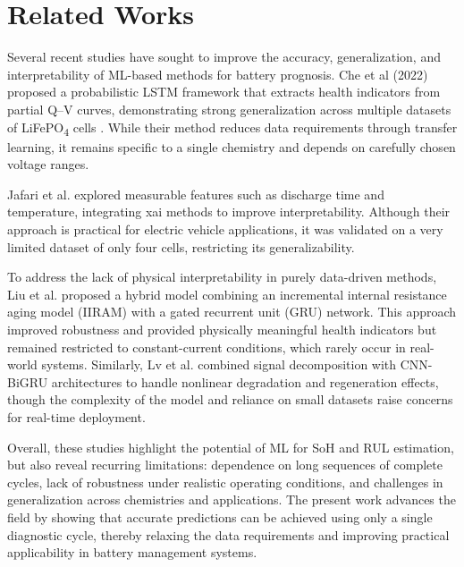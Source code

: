 \section{Related Works} \label{sec:related_works}

Several recent studies have sought to improve the accuracy, generalization, and interpretability of ML-based methods for battery prognosis. Che et al (2022) proposed a probabilistic LSTM framework that extracts health indicators from partial Q--V curves, demonstrating strong generalization across multiple datasets of LiFePO\textsubscript{4} cells \cite{Che2022}. While their method reduces data requirements through transfer learning, it remains specific to a single chemistry and depends on carefully chosen voltage ranges.  

Jafari et al. \cite{Jafari2024} explored measurable features such as discharge time and temperature, integrating \acf{xai} methods to improve interpretability. Although their approach is practical for electric vehicle applications, it was validated on a very limited dataset of only four cells, restricting its generalizability.

To address the lack of physical interpretability in purely data-driven methods, Liu et al. \cite{Liu2025} proposed a hybrid model combining an incremental internal resistance aging model (IIRAM) with a gated recurrent unit (GRU) network. This approach improved robustness and provided physically meaningful health indicators but remained restricted to constant-current conditions, which rarely occur in real-world systems. Similarly, Lv et al. \cite{Lv2024} combined signal decomposition with CNN-BiGRU architectures to handle nonlinear degradation and regeneration effects, though the complexity of the model and reliance on small datasets raise concerns for real-time deployment.  

Overall, these studies highlight the potential of ML for SoH and RUL estimation, but also reveal recurring limitations: dependence on long sequences of complete cycles, lack of robustness under realistic operating conditions, and challenges in generalization across chemistries and applications. The present work advances the field by showing that accurate predictions can be achieved using only a single diagnostic cycle, thereby relaxing the data requirements and improving practical applicability in battery management systems.
